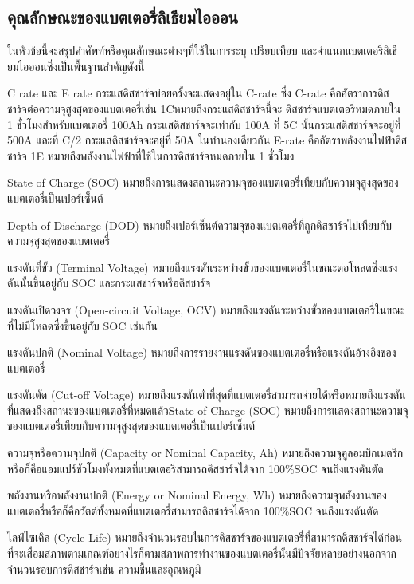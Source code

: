 \subsection{คุณลักษณะของแบตเตอรี่ลิเธียมไอออน}
ในหัวข้อนี้จะสรุปคำศัพท์หรือคุณลักษณะต่างๆที่ใช้ในการระบุ เปรียบเทียบ และจำแนกแบตเตอรี่ลิเธียมไอออนซึ่งเป็นพื้นฐานสำคัญดังนี้
\begin{itemize}
	{\item
		C rate และ E rate กระแสดิสชาร์จบ่อยครั้งจะแสดงอยู่ใน C-rate ซึ่ง C-rate คืออัตราการดิสชาร์จต่อความจุสูงสุดของแบตเตอรี่เช่น 1Cหมายถึงกระแสดิสชาร์จนี้จะ
		ดิสชาร์จแบตเตอรี่หมดภายใน 1 ชั่วโมงสำหรับแบตเตอรี่ 100Ah กระแสดิสชาร์จจะเท่ากับ 100A ที่ 5C นั้นกระแสดิสชาร์จจะอยู่ที่ 500A และที่ C/2 
		กระแสดิสชาร์จจะอยู่ที่ 50A ในทำนองเดียวกัน E-rate คืออัตราพลังงานไฟฟ้าดิสชาร์จ 1E หมายถึงพลังงานไฟฟ้าที่ใช้ในการดิสชาร์จหมดภายใน 1 ชั่วโมง}
	{\item
		State of Charge (SOC) หมายถึงการแสดงสถานะความจุของแบตเตอรี่เทียบกับความจุสูงสุดของแบตเตอรี่เป็นเปอร์เซ็นต์}
	{\item
		Depth of Discharge (DOD) หมายถึงเปอร์เซ็นต์ความจุของแบตเตอรี่ที่ถูกดิสชาร์จไปเทียบกับความจุสูงสุดของแบตเตอรี่}
	{\item
		แรงดันที่ขั้ว (Terminal Voltage) หมายถึงแรงดันระหว่างขั้วของแบตเตอรี่ในขณะต่อโหลดซึ่งแรงดันนั้นขึ้นอยู่กับ SOC และกระแสชาร์จหรือดิสชาร์จ}
	{\item
		แรงดันเปิดวงจร (Open-circuit Voltage, OCV) หมายถึงแรงดันระหว่างขั้วของแบตเตอรี่ในขณะที่ไม่มีโหลดซึ่งขึ้นอยู่กับ SOC เช่นกัน}
	{\item
		แรงดันปกติ (Nominal Voltage) หมายถึงการรายงานแรงดันของแบตเตอรี่หรือแรงดันอ้างอิงของแบตเตอรี่}
	{\item
		แรงดันตัด (Cut-off Voltage) หมายถึงแรงดันต่ำที่สุดที่แบตเตอรี่สามารถจ่ายได้หรือหมายถึงแรงดันที่แสดงถึงสถานะของแบตเตอรี่ที่หมดแล้วState of Charge (SOC) หมายถึงการแสดงสถานะความจุของแบตเตอรี่เทียบกับความจุสูงสุดของแบตเตอรี่เป็นเปอร์เซ็นต์}
	{\item
		ความจุหรือความจุปกติ (Capacity or Nominal Capacity, Ah) หมายถึงความจุคูลอมบิกเมตริกหรือก็คือแอมแปร์ชั่วโมงทั้งหมดที่แบตเตอรี่สามารถดิสชาร์จได้จาก 100\%SOC จนถึงแรงดันตัด}
	{\item
		พลังงานหรือพลังงานปกติ (Energy or Nominal Energy, Wh) หมายถึงความจุพลังงานของแบตเตอรี่หรือก็คือวัตต์ทั้งหมดที่แบตเตอรี่สามารถดิสชาร์จได้จาก 100\%SOC จนถึงแรงดันตัด}
	{\item
		ไลฟ์ไซเคิล (Cycle Life) หมายถึงจำนวนรอบในการดิสชาร์จของแบตเตอรี่ที่สามารถดิสชาร์จได้ก่อนที่จะเสื่อมสภาพตามเกณฑ์อย่างไรก็ตามสภาพการทำงานของแบตเตอรี่นั้นมีปัจจัยหลายอย่างนอกจากจำนวนรอบการดิสชาร์จเช่น ความชื้นและอุณหภูมิ}

\end{itemize}
